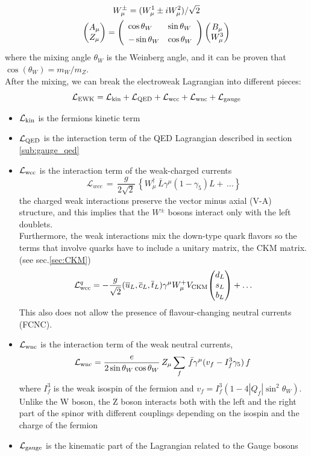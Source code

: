 \begin{gather}
    W_\mu^{\pm}=(W^1_\mu\pm i W^2_\mu)/\sqrt{2}\\
    \db{A_\mu}{Z_\mu}=\left(\begin{array}{l l}{{\cos\theta_{W}}}&{{\sin\theta_{W}}}\\ {{-\sin\theta_{W}}}&{{\cos\theta_{W}}}\end{array}\right)\db{B_\mu}{W^3_\mu}
\end{gather}
where the mixing angle $\theta_W$ is the Weinberg angle, and it can be proven that $\cos(\theta_W)=m_W/m_Z$.\\
After the mixing, we can break the electroweak Lagrangian into different pieces:
\begin{equation}\label{eq:EWK}
    \mathcal{L}_\text{EWK}=\mathcal{L}_\text{kin}+\mathcal{L}_\text{QED}+\mathcal{L}_\text{wcc}+\mathcal{L}_\text{wnc}+\mathcal{L}_\text{gauge}
\end{equation}

\begin{itemize}
    \item  $\mathcal{L}_\text{kin}$ is the fermions kinetic term
    \item $\mathcal{L}_\text{QED}$ is the interaction term of the QED Lagrangian described in section \ref{sub:gauge_qed}
    \item $\mathcal{L}_\text{wcc}$ is the interaction term of the weak-charged currents
    \begin{equation}
        {\mathcal{L}}_{wcc}\,=\,\frac{g}{2{\sqrt{2}}}\,\left\{W_{\mu}^{\dagger}\,\bar{L}\gamma^{\mu}(1-\gamma_{5})L+\,\dots \right\}
    \end{equation}
    the charged weak interactions preserve the vector minus axial (V-A) structure, and this implies that the $W^\pm$ bosons interact only with the left doublets.\\
    Furthermore, the weak interactions mix the down-type quark flavors so the terms that involve quarks have to include a unitary matrix, the CKM matrix. (see sec.\ref{sec:CKM})
    \begin{equation}
        \Lg{wcc}^q=-\frac{g}{\sqrt{2}}(\overline{{{u}}}_{L},\overline{{{c}}}_{L},\overline{{{t}}}_{L})\gamma^{\mu}W_{\mu}^{+}V_{\mathrm{CKM}}\tb{d_{L}}{s_{L}}{b_L}+\dots
    \end{equation}
    This also does not allow the presence of flavour-changing neutral currents (FCNC).
    \item $\mathcal{L}_\text{wnc}$ is the interaction term of the weak neutral currents,
    \begin{equation}
        \mathcal{L}_\text{wnc}=\frac{e}{2\sin\theta_{W}\cos\theta_{W}}\,Z_{\mu}\sum_{f}\,\bar{f}\gamma^{\mu}(v_{f}-I^3_{f}\gamma_{5})\,f\;
    \end{equation}
    where $I^3_f$ is the weak isospin of the fermion and $v_f=I^{3}_{f}\left(1-4|Q_{f}|\sin^{2}\theta_{W}\right)$.
    Unlike the W boson, the Z boson interacts both with the left and the right part of the spinor with different couplings depending on the isospin and the charge of the fermion 
    \item $\mathcal{L}_\text{gauge}$ is the kinematic part of the Lagrangian related to the Gauge bosons
\end{itemize}



